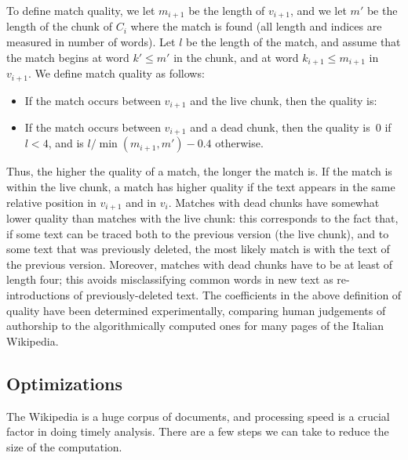 To define match quality, we let $m_{i+1}$ be the length of $v_{i+1}$,
and we let $m'$ be the length of the chunk of $C_i$ where the match is
found (all length and indices are measured in number of words).
Let $l$ be the length of the match, and assume that the match begins
at word $k' \leq m'$ in the chunk, and at word $k_{i+1} \leq m_{i+1}$
in $v_{i+1}$.
We define match quality as follows:
%
\begin{itemize}
\item If the match occurs between $v_{i+1}$ and the live chunk, then
the quality is:
\item If the match occurs between $v_{i+1}$ and a dead chunk, then the
quality is~0 if $l < 4$, and is
$
  {l}/{\min(m_{i+1},m')} - 0.4
$ otherwise.
\end{itemize}
%
Thus, the higher the quality of a match, the longer the match is.
If the match is within the live chunk, a match has higher quality if the
text appears in the same relative position in $v_{i+1}$ and in $v_i$.
Matches with dead chunks have somewhat lower quality than matches with
the live chunk: this corresponds to the fact that, if some text can be
traced both to the previous version (the live chunk), and to some
text that was previously deleted, the most likely match is with the
text of the previous version.
Moreover, matches with dead chunks have to be at least of length four;
this avoids misclassifying common words in new text as re-introductions
of previously-deleted text.
The coefficients in the above definition of quality have been
determined experimentally, comparing human judgements of authorship to
the algorithmically computed ones for many pages of the Italian
Wikipedia.


\subsection{Optimizations}

The Wikipedia is a huge corpus of documents, and processing speed
is a crucial factor in doing timely analysis.
There are a few steps we can take to reduce the size of the computation.

